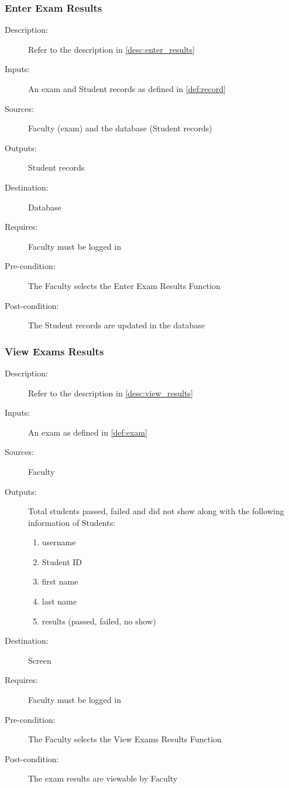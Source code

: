 \subsubsection{\large Enter Exam Results} 
\begin{boxed} %
\begin{description}
\item[Description:]
   Refer to the description in \autoref{desc:enter_results}
\item[Inputs:]
   An exam and Student records as defined in \autoref{def:record}
\item[Sources:]
   Faculty (exam) and the database (Student records)
\item[Outputs:]
   Student records
\item[Destination:]
   Database
\item[Requires:]
   Faculty must be logged in
\item[Pre-condition:]
   The Faculty selects the Enter Exam Results Function
\item[Post-condition:]
   The Student records are updated in the database
\end{description}
\end{boxed} %

\subsubsection{\large View Exams Results} 
\begin{boxed} %
\begin{description}
\item[Description:]
   Refer to the description in \autoref{desc:view_results}
\item[Inputs:]
   An exam as defined in \autoref{def:exam}
\item[Sources:]
   Faculty
\item[Outputs:]
   Total students passed, failed and did not show along with the following
   information of Students:
   \begin{enumerate}
      \item username
      \item Student ID
      \item first name
      \item last name
      \item results (passed, failed, no show)
   \end{enumerate}
\item[Destination:]
   Screen
\item[Requires:]
   Faculty must be logged in
\item[Pre-condition:]
   The Faculty selects the View Exams Results Function
\item[Post-condition:]
   The exam results are viewable by Faculty
\end{description}
\end{boxed} %

